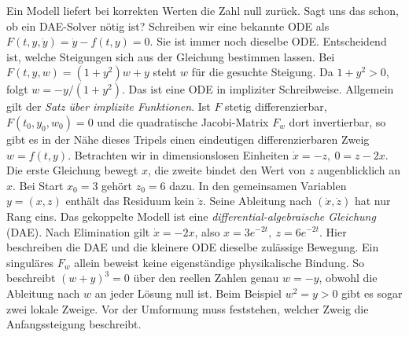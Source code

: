 Ein Modell liefert bei korrekten Werten die Zahl null zurück. Sagt uns das schon, ob ein DAE-Solver nötig ist? Schreiben wir eine bekannte ODE als \(F(t,y,\dot y)=\dot y-f(t,y)=0\). Sie ist immer noch dieselbe ODE. Entscheidend ist, welche Steigungen sich aus der Gleichung bestimmen lassen.
Bei \(F(t,y,w)=(1+y^2)w+y\) steht \(w\) für die gesuchte Steigung. Da \(1+y^2>0\), folgt \(w=-y/(1+y^2)\). Das ist eine ODE in impliziter Schreibweise. Allgemein gilt der \emph{Satz über implizite Funktionen}. Ist \(F\) stetig differenzierbar, \(F(t_0,y_0,w_0)=0\) und die quadratische Jacobi-Matrix \(F_w\) dort invertierbar, so gibt es in der Nähe dieses Tripels einen eindeutigen differenzierbaren Zweig \(w=f(t,y)\).
Betrachten wir in dimensionslosen Einheiten \(\dot x=-z,\ 0=z-2x\). Die erste Gleichung bewegt \(x\), die zweite bindet den Wert von \(z\) augenblicklich an \(x\). Bei Start \(x_0=3\) gehört \(z_0=6\) dazu. In den gemeinsamen Variablen \(y=(x,z)\) enthält das Residuum kein \(\dot z\). Seine Ableitung nach \((\dot x,\dot z)\) hat nur Rang eins. Das gekoppelte Modell ist eine \emph{differential-algebraische Gleichung} (DAE). Nach Elimination gilt \(\dot x=-2x\), also \(x=3e^{-2t},\ z=6e^{-2t}\). Hier beschreiben die DAE und die kleinere ODE dieselbe zulässige Bewegung.
Ein singuläres \(F_w\) allein beweist keine eigenständige physikalische Bindung. So beschreibt \((w+y)^3=0\) über den reellen Zahlen genau \(w=-y\), obwohl die Ableitung nach \(w\) an jeder Lösung null ist. Beim Beispiel \(w^2=y>0\) gibt es sogar zwei lokale Zweige. Vor der Umformung muss feststehen, welcher Zweig die Anfangssteigung beschreibt.

